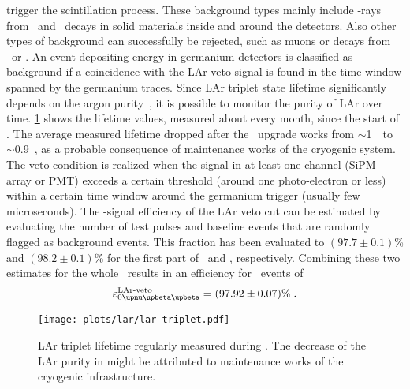 trigger the scintillation process. These background types mainly include \g-rays from \Ra\
and \Th\ decays in solid materials inside and around the detectors. Also other types of
background can successfully be rejected, such as muons or decays from \Arh\ or \kvz. An
event depositing energy in germanium detectors is classified as background if a
coincidence with the LAr veto signal is found in the time window spanned by the germanium
traces. Since LAr triplet state lifetime significantly depends on the argon
purity~\cite{Amsler2007}, it is possible to monitor the purity of LAr over time.
\cref{fig:lar:triplet-lifetime} shows the lifetime values, measured about every month,
since the start of \phasetwo. The average measured lifetime dropped after the \phasetwop\
upgrade works from $\sim$1~\mus\ to $\sim$0.9~\mus, as a probable consequence of
maintenance works of the cryogenic system.  The veto condition is realized when the signal
in at least one channel (SiPM array or PMT) exceeds a certain threshold (around one
photo-electron or less) within a certain time window around the germanium trigger (usually
few microseconds). The \onbb-signal efficiency of the LAr veto cut can be estimated by
evaluating the number of test pulses and baseline events that are randomly flagged as
background events. This fraction has been evaluated to $(97.7 \pm 0.1)$\% and $(98.2 \pm
0.1)$\% for the first part of \phasetwo\ and \phasetwop, respectively. Combining these two
estimates for the whole \phasetwo\ results in an efficiency for \onbb\ events of
\[
  \epsilon_\onbbM^\text{LAr-veto} = (97.92 \pm 0.07)\% \;.
\]

\begin{figure}
  \centering
  \texttt{[image: plots/lar/lar-triplet.pdf]}
  \caption{%
    LAr triplet lifetime regularly measured during \phasetwo. The decrease of the LAr
    purity in  might be attributed to maintenance works of the cryogenic
    infrastructure.
  }\label{fig:lar:triplet-lifetime}
\end{figure}

